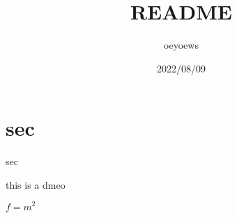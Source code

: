 \documentclass{book}
\title{README}
\author{oeyoews}
\date{2022/08/09}
\begin{document}
\maketitle

\section{sec}%
sec

 this is a dmeo

$f = m^2$
\end{document}
